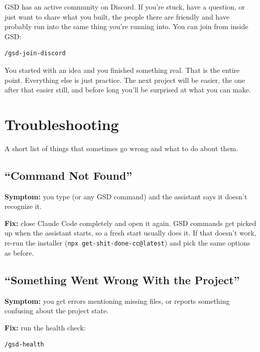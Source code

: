 \documentclass[11pt,letterpaper,openany]{book}
\begin{document}
GSD has an active community on Discord. If you're stuck, have a
question, or just want to share what you built, the people there are
friendly and have probably run into the same thing you're running
into. You can join from inside GSD:

\begin{lstlisting}
/gsd-join-discord
\end{lstlisting}

\begin{gsdsuccess}
You started with an idea and you finished something real. That is
the entire point. Everything else is just practice. The next project
will be easier, the one after that easier still, and before long
you'll be surprised at what you can make.
\end{gsdsuccess}

\appendix
\chapter{Troubleshooting}

A short list of things that sometimes go wrong and what to do about
them.

\section{``Command Not Found''}

\textbf{Symptom:} you type  (or any GSD command) and the
assistant says it doesn't recognize it.

\textbf{Fix:} close Claude Code completely and open it again. GSD
commands get picked up when the assistant starts, so a fresh start
usually does it. If that doesn't work, re-run the installer
(\texttt{npx get-shit-done-cc@latest}) and pick the same options as
before.

\section{``Something Went Wrong With the Project''}

\textbf{Symptom:} you get errors mentioning missing files, or
 reports something confusing about the project
state.

\textbf{Fix:} run the health check:

\begin{lstlisting}
/gsd-health
\end{lstlisting}
\end{document}
